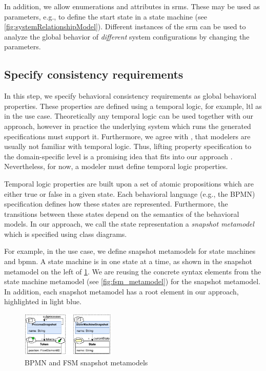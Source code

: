 \documentclass{jot}
\begin{document}
In addition, we allow enumerations and attributes in \gls*{srm}s.
These may be used as parameters, e.g., to define the start state in a state machine (see \cref{fig:systemRelationshipModel}).
Different instances of the \gls*{srm} can be used to analyze the global behavior of \emph{different} system configurations by changing the parameters.


\subsection{Specify consistency requirements} \label{subsec:specify_consistency_requirements}
In this step, we specify behavioral consistency requirements as global behavioral properties.
These properties are defined using a temporal logic, for example, \gls*{ltl} as in the use case.
Theoretically any temporal logic can be used together with our approach, however in practice the underlying system which runs the generated specifications must support it.
Furthermore, we agree with \cite{meyersProMoBoxFrameworkGenerating2014}, that modelers are usually not familiar with temporal logic.
Thus, lifting property specification to the domain-specific level is a promising idea that fits into our approach \cite{meyersProMoBoxFrameworkGenerating2014}.
Nevertheless, for now, a modeler must define temporal logic properties.

Temporal logic properties are built upon a set of atomic propositions which are either true or false in a given state.
Each behavioral language (e.g., the BPMN) specification defines how these states are represented.
Furthermore, the transitions between these states depend on the semantics of the behavioral models.
In our approach, we call the state representation a \emph{snapshot metamodel} which is specified using class diagrams.

For example, in the use case, we define snapshot metamodels for state machines and \gls*{bpmn}.
A state machine is in one state at a time, as shown in the snapshot metamodel on the left of \cref{fig:snapshot_metamodels}.
We are reusing the concrete syntax elements from the state machine metamodel (see \cref{fig:fsm_metamodel}) for the snapshot metamodel.
In addition, each snapshot metamodel has a root element in our approach, highlighted in light blue.
\begin{figure}[h]
    \centering
    \includegraphics[width=0.4\textwidth]{figures/snapshot_metamodels.pdf}
    \caption{BPMN and FSM snapshot metamodels}
    \label{fig:snapshot_metamodels}
\end{figure}
\end{document}
